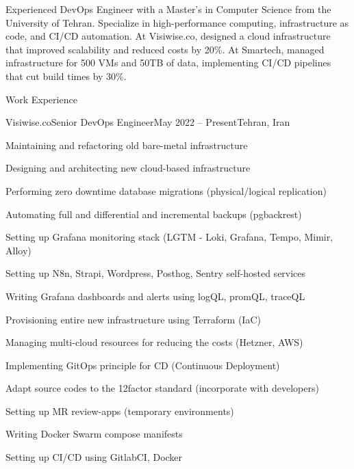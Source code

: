 \documentclass[]{main}
\begin{document}
\resumeheader
{}
{}
{}
{}
{}
{}

Experienced DevOps Engineer with a Master's in Computer Science from the University of Tehran. Specialize in high-performance computing, infrastructure as code, and CI/CD automation. At Visiwise.co, designed a cloud infrastructure that improved scalability and reduced costs by 20\%. At Smartech, managed infrastructure for 500 VMs and 50TB of data, implementing CI/CD pipelines that cut build times by 30\%.

\begin{section}{Work Experience}
 \begin{subsection}{Visiwise.co}{Senior DevOps Engineer}{May 2022 -- Present}{Tehran, Iran}
     \item Maintaining and refactoring old bare-metal infrastructure
     \item Designing and architecting new cloud-based infrastructure
     \item Performing zero downtime database migrations (physical/logical replication)
     \item Automating full and differential and incremental backups (pgbackrest)
     \item Setting up Grafana monitoring stack (LGTM - Loki, Grafana, Tempo, Mimir, Alloy)
     \item Setting up N8n, Strapi, Wordpress, Posthog, Sentry self-hosted services
     \item Writing Grafana dashboards and alerts using logQL, promQL, traceQL
     \item Provisioning entire new infrastructure using Terraform (IaC)
     \item Managing multi-cloud resources for reducing the costs (Hetzner, AWS)
     \item Implementing GitOps principle for CD (Continuous Deployment)
     \item Adapt source codes to the 12factor standard (incorporate with developers)
     \item Setting up MR review-apps (temporary environments)
     \item Writing Docker Swarm compose manifests
     \item Setting up CI/CD using GitlabCI, Docker
 \end{subsection}


\end{section}
\end{document}
